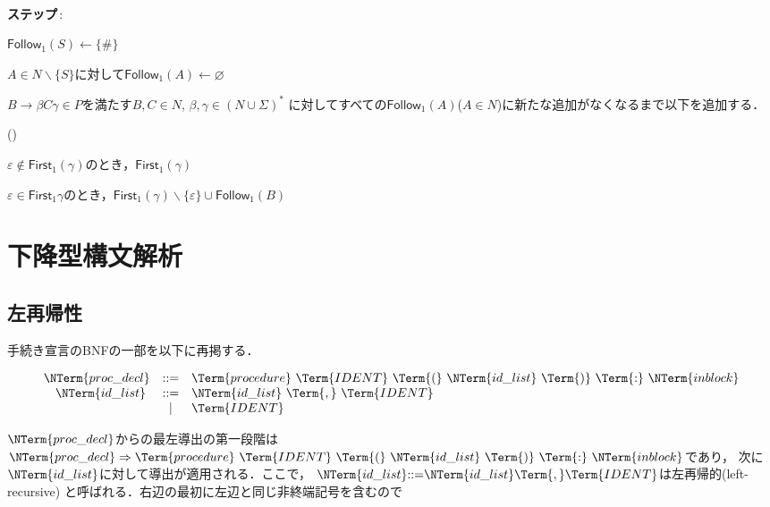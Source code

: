 \documentclass[a4j,dvipdfmx]{jbook}
\begin{document}
\begin{Alg}\ 
  \begin{list}{{\bf ステップ}\,{\rm {}:}}{}
    \item $\mathsf{Follow}_1(S)\leftarrow\{\#\}$
    \item $A\in N\backslash\{S\}$に対して$\mathsf{Follow}_1(A)\leftarrow\varnothing$
    \item 
    $B\rightarrow\beta C\gamma\in P$を満たす$B,C\in N$, $\beta,\gamma\in(N\cup\Sigma)^\ast$
    に対してすべての$\mathsf{Follow}_1(A)$($A\in N$)に新たな追加がなくなるまで以下を追加する．
    \begin{list}{(\alph{bean})}{\usecounter{bean}}
      \item $\varepsilon\notin\mathsf{First}_1(\gamma)$のとき，$\mathsf{First}_1(\gamma)$
      \item $\varepsilon\in\mathsf{First}_1{\gamma}$のとき，$\mathsf{First}_1(\gamma)\backslash\{\varepsilon\}\cup\mathsf{Follow}_1(B)$
    \end{list}
  \end{list}
\end{Alg}

\section{下降型構文解析}

\subsection{左再帰性}

手続き宣言のBNFの一部を以下に再掲する．

\[\begin{array}{rcl}
\NTerm{proc\_decl} & \mathtt{::=} & \Term{procedure}\ \Term{IDENT}\ \Term{(}\ 
\NTerm{id\_list}\ \Term{)}\ \Term{:}\ \NTerm{inblock}\\
\NTerm{id\_list}\ & \mathtt{::=} & \NTerm{id\_list}\ \Term{,}\ \Term{IDENT}\\
& | & \Term{IDENT}\\
\end{array}\]

$\NTerm{proc\_decl}$からの最左導出の第一段階は
$\NTerm{proc\_decl}\Rightarrow\Term{procedure}\ \Term{IDENT}\ \Term{(}\ \NTerm{id\_list}\ \Term{)}\ \Term{:}\ \NTerm{inblock}$であり，
次に$\NTerm{id\_list}$に対して導出が適用される．ここで，
$\NTerm{id\_list}\mathtt{::=}\NTerm{id\_list}\Term{,}\Term{IDENT}$は左再帰的(left-recursive)
と呼ばれる．右辺の最初に左辺と同じ非終端記号を含むので
\end{document}
